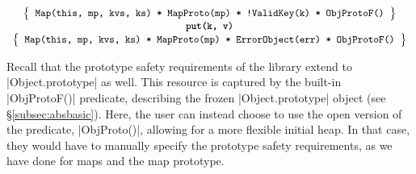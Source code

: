 \begin{displaymath} 
{\footnotesize
\begin{array}{c}
\left\{ {\begin{array}{c}
 \text{\texttt{Map(this, mp, kvs, ks) * MapProto(mp) * !ValidKey(k) * ObjProtoF()}} 
\end{array}} \right\} \\
%
\text{\bfseries \texttt{put(k, v)}} \\[0.2mm]
%
\left\{ {\begin{array}{c}
 \text{\texttt{Map(this, mp, kvs, ks) * MapProto(mp) * ErrorObject(err) * ObjProtoF()}} 
\end{array}} \right\}
\end{array}
} 
\end{displaymath}

Recall that the prototype safety requirements of the library extend to \jsinline|Object.prototype| as well. 
This resource is captured by the built-in \jsinline|ObjProtoF()| predicate, describing the frozen
\jsinline|Object.prototype| object (see \S\ref{subsec:absbasic}). Here, the user can instead choose to use the open version of the predicate, \jsinline|ObjProto()|, allowing for a more flexible initial heap. In that case,
they would have to manually specify the prototype safety requirements, as we have done for maps and the map prototype.

